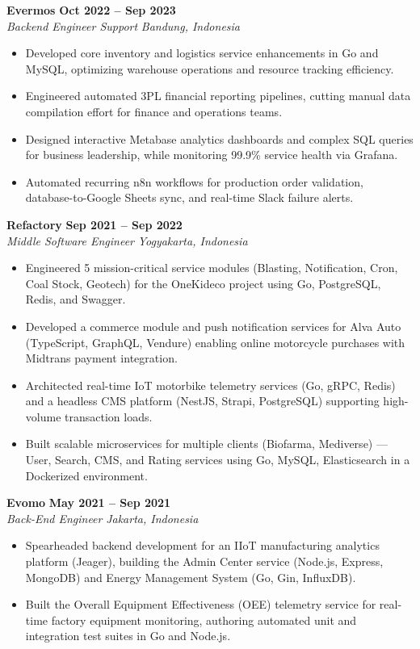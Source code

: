 \documentclass[10pt, letterpaper]{article}
\newcommand{\jobheader}[4]{%
  \noindent\textbf{#1} \hfill \textbf{#2}\\[1pt]
  \textit{#3} \hfill \textit{#4}\\[1.5pt]
}
\begin{document}
\jobheader{Evermos}{Oct 2022 -- Sep 2023}{Backend Engineer Support}{Bandung, Indonesia}
\begin{itemize}
  \item Developed core inventory and logistics service enhancements in Go and MySQL, optimizing warehouse operations and resource tracking efficiency.
  \item Engineered automated 3PL financial reporting pipelines, cutting manual data compilation effort for finance and operations teams.
  \item Designed interactive Metabase analytics dashboards and complex SQL queries for business leadership, while monitoring 99.9\% service health via Grafana.
  \item Automated recurring n8n workflows for production order validation, database-to-Google Sheets sync, and real-time Slack failure alerts.
\end{itemize}
\vspace{2pt}

\newpage
\jobheader{Refactory}{Sep 2021 -- Sep 2022}{Middle Software Engineer}{Yogyakarta, Indonesia}
\begin{itemize}
  \item Engineered 5 mission-critical service modules (Blasting, Notification, Cron, Coal Stock, Geotech) for the OneKideco project using Go, PostgreSQL, Redis, and Swagger.
  \item Developed a commerce module and push notification services for Alva Auto (TypeScript, GraphQL, Vendure) enabling online motorcycle purchases with Midtrans payment integration.
  \item Architected real-time IoT motorbike telemetry services (Go, gRPC, Redis) and a headless CMS platform (NestJS, Strapi, PostgreSQL) supporting high-volume transaction loads.
  \item Built scalable microservices for multiple clients (Biofarma, Mediverse) — User, Search, CMS, and Rating services using Go, MySQL, Elasticsearch in a Dockerized environment.
\end{itemize}
\vspace{2pt}

\jobheader{Evomo}{May 2021 -- Sep 2021}{Back-End Engineer}{Jakarta, Indonesia}
\begin{itemize}
  \item Spearheaded backend development for an IIoT manufacturing analytics platform (Jeager), building the Admin Center service (Node.js, Express, MongoDB) and Energy Management System (Go, Gin, InfluxDB).
  \item Built the Overall Equipment Effectiveness (OEE) telemetry service for real-time factory equipment monitoring, authoring automated unit and integration test suites in Go and Node.js.
\end{itemize}
\vspace{2pt}
\end{document}
